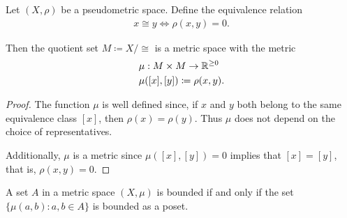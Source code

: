 \begin{proposition}\label{thm:pseudometric_to_metric}
  Let $(X, \rho)$ be a pseudometric space. Define the equivalence relation
  \begin{align*}
    x \cong y \iff \rho(x, y) = 0.
  \end{align*}

  Then the quotient set $M \coloneqq X / \cong$ is a metric space with the metric
  \begin{align*}
    &\mu: M \times M \to \mathbb R^{\geq 0} \\
    &\mu([x], [y]) \coloneqq \rho(x, y).
  \end{align*}
\end{proposition}
\begin{proof}
  The function $\mu$ is well defined since, if $x$ and $y$ both belong to the same equivalence class $[x]$, then $\rho(x) = \rho(y)$. Thus $\mu$ does not depend on the choice of representatives.

  Additionally, $\mu$ is a metric since $\mu([x], [y]) = 0$ implies that $[x] = [y]$, that is, $\rho(x, y) = 0$.
\end{proof}

\begin{proposition}\label{note:bounded_set_metric_order_equivalence}
  A set $A$ in a metric space $(X, \mu)$ is bounded if and only if the set $\{ \mu(a, b) \colon a, b \in A \}$ is bounded as a poset.
\end{proposition}

